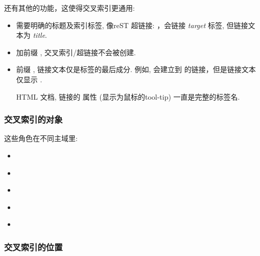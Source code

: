 \documentclass[letterpaper,10pt,english]{sphinxmanual}
\begin{document}
还有其他的功能，这使得交叉索引更通用:
\begin{itemize}
\item {} 
需要明确的标题及索引标签, 像reST 超链接:  ，会链接 \emph{target} 标签, 但链接文本为 \emph{title}.

\item {} 
加前缀 \code{!}, 交叉索引/超链接不会被创建.

\item {} 
前缀 \code{\textasciitilde{}}, 链接文本仅是标签的最后成分.
例如,  会建立到  的链接，但是链接文本仅显示  .

HTML 文档, 链接的  属性 (显示为鼠标的tool-tip) 一直是完整的标签名.

\end{itemize}


\subsubsection{交叉索引的对象}
\label{markup/inline:id5}
这些角色在不同主域里:
\begin{itemize}
\item {} 
{\hyperref[domains:python\string-roles]{}}

\item {} 
{\hyperref[domains:c\string-roles]{}}

\item {} 
{\hyperref[domains:cpp\string-roles]{}}

\item {} 
{\hyperref[domains:js\string-roles]{}}

\item {} 
{\hyperref[domains:rst\string-roles]{}}

\end{itemize}


\subsubsection{交叉索引的位置}
\label{markup/inline:id6}\label{markup/inline:ref-role}
\end{document}
